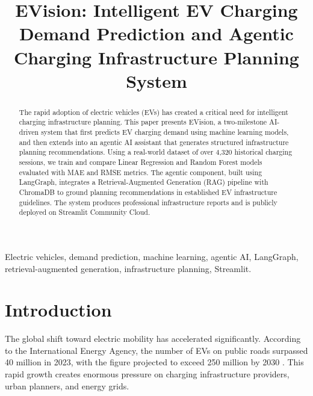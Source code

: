 \documentclass[conference]{IEEEtran}
\begin{document}
\title{EVision: Intelligent EV Charging Demand Prediction and Agentic Charging Infrastructure Planning System}

\author{
}

\maketitle

\begin{abstract}
The rapid adoption of electric vehicles (EVs) has created a critical need for intelligent charging infrastructure planning. This paper presents EVision, a two-milestone AI-driven system that first predicts EV charging demand using machine learning models, and then extends into an agentic AI assistant that generates structured infrastructure planning recommendations. Using a real-world dataset of over 4,320 historical charging sessions, we train and compare Linear Regression and Random Forest models evaluated with MAE and RMSE metrics. The agentic component, built using LangGraph, integrates a Retrieval-Augmented Generation (RAG) pipeline with ChromaDB to ground planning recommendations in established EV infrastructure guidelines. The system produces professional infrastructure reports and is publicly deployed on Streamlit Community Cloud.
\end{abstract}

\begin{IEEEkeywords}
Electric vehicles, demand prediction, machine learning, agentic AI, LangGraph, retrieval-augmented generation, infrastructure planning, Streamlit.
\end{IEEEkeywords}

\section{Introduction}

The global shift toward electric mobility has accelerated significantly. According to the International Energy Agency, the number of EVs on public roads surpassed 40 million in 2023, with the figure projected to exceed 250 million by 2030 \cite{iea2023}. This rapid growth creates enormous pressure on charging infrastructure providers, urban planners, and energy grids.
\end{document}
